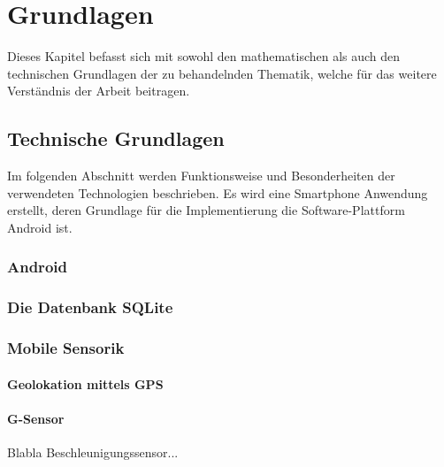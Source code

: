 \chapter{Grundlagen}
Dieses Kapitel befasst sich mit sowohl den mathematischen als auch den technischen Grundlagen der zu behandelnden Thematik, welche für das weitere Verständnis der Arbeit beitragen.
\section{Technische Grundlagen}
Im folgenden Abschnitt werden Funktionsweise und Besonderheiten der verwendeten Technologien beschrieben. Es wird eine Smartphone Anwendung erstellt, deren Grundlage für die Implementierung die Software-Plattform Android ist.
\subsection{Android}


\subsection{Die Datenbank SQLite}
\subsection{Mobile Sensorik} 
\subsubsection{Geolokation mittels \gls{GPS}}
\subsubsection{G-Sensor}
Blabla Beschleunigungssensor...
\clearpage
